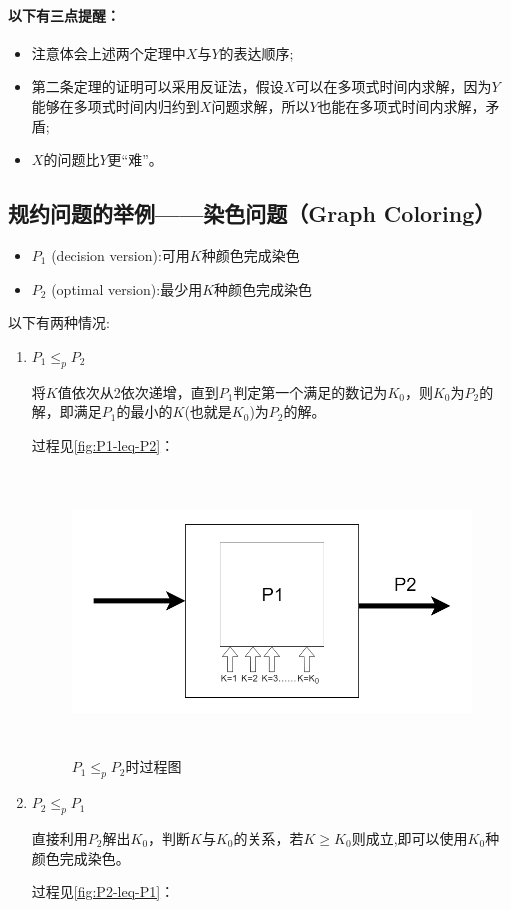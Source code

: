 \paragraph*{以下有三点提醒：}

\begin{itemize}
	\item 注意体会上述两个定理中$X$与$Y$的表达顺序;
	\item 第二条定理的证明可以采用反证法，假设$X$可以在多项式时间内求解，因为$Y$能够在多项式时间内归约到$X$问题求解，所以$Y$也能在多项式时间内求解，矛盾;
	\item $X$的问题比$Y$更“难”。
\end{itemize}

	\subsection{规约问题的举例——染色问题（Graph Coloring）}

\begin{itemize}
\item $P_1$ (decision version):可用$K$种颜色完成染色
\item $P_2$ (optimal version):最少用$K$种颜色完成染色
\end{itemize}

以下有两种情况:


	\begin{enumerate}
	\item $P_1\leq_pP_2$
	
将$K$值依次从2依次递增，直到$P_1$判定第一个满足的数记为$K_0$，则$K_0$为$P_2$的解，即满足$P_1$的最小的$K$(也就是$K_0$)为$P_2$的解。

过程见\autoref{fig:P1-leq-P2}：


	\begin{figure}[h]
		\begin{minipage}[t]{1\linewidth}
			\centering
			\includegraphics[width=15cm,height=7.5cm]{image/P_NP2.png}
			\caption{$P_1\leq_pP_2$时过程图}\label{fig:P1-leq-P2}
		\end{minipage}
	\end{figure}


	\item  $P_2\leq_pP_1$
	
	直接利用$P_2$解出$K_0$，判断$K$与$K_0$的关系，若$K\geq K_0$则成立,即可以使用$K_0$种颜色完成染色。
	
过程见\autoref{fig:P2-leq-P1}：
	\end{enumerate}
	

